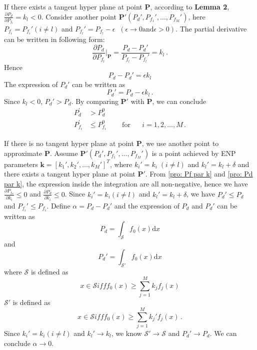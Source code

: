 \documentclass[12pt,journal,a4paper,twoside,onecolumn]{IEEEtran}
\begin{document}
\begin{spacing}{2.5}
 If there exists a tangent hyper plane at point $\mathbf{P}$, according to \textbf{Lemma 2}, $\frac{\partial P_d}{\partial P_{f_l}} = k_l < 0$. Consider another point $\mathbf{P}' (P_d', P_{f_1}', ..., P_{f_M}')$, here $P_{f_i} = P_{f_i}' (i \neq l)$ and $P_{f_l}' = P_{f_l} - \epsilon \;\;(\epsilon \rightarrow 0 \text{and} \epsilon >0)$. The partial derivative can be written in following form:
 \begin{equation}
   \frac{\partial P_d}{ \partial P_{f_l}} \bigg|_{\mathbf{P}} = \frac{P_d - P_d'}{P_{f_l} - P_{f_l}'} = k_l\,.
 \end{equation}
 Hence
 \begin{equation}
   P_d - P_d' = \epsilon k_l
 \end{equation}
 The expression of $P_d'$ can be written as
 \begin{equation}
   P_d'= P_d - \epsilon k_l\,.
 \end{equation}
Since $k_l < 0$, $P_d' > P_d$. By comparing $\mathbf{P}'$ with $\mathbf{P}$, we can conclude
\begin{equation}
\begin{split}
  P_{d}^\prime &> P_{d}^0\\
  P_{f_i}^\prime &\leq P_{f_i}^0 \;\;\;\;\;\;\;\;\text{for}\;\;\;\;\;\; i=1, 2, ..., M\,.
\end{split}
\end{equation}

If there is no tangent hyper plane at point $\mathbf{P}$, we use another point to approximate $\mathbf{P}$. 
Assume $\mathbf{P}' (P_d', P_{f_1}', ..., P_{f_M}')$ is a point achieved by ENP parameters $\mathbf{k}=[k_1', k_2', ..., k_M']^T$, where $k_i' = k_i \;(i \neq l)$ and $k_l' = k_l + \delta$ and there exists a tangent hyper plane at point $\mathbf{P}'$. From \eqref{pro: Pf par k} and \eqref{pro: Pd par k}, the expression inside the integration are all non-negative, hence we have $\frac{\partial P_{f_n}}{\partial k_i} \leq 0$ and $\frac{\partial P_d}{\partial k_i} \leq 0$. Since $k_i' = k_i (i \neq l)$ and $k_l' = k_l + \delta$, we have $P_d' \leq P_d$ and $P_{f_i}' \leq P_{f_i}$. Define $\alpha = P_d - P_d'$ and the expression of $P_d$ and $P_d'$ can be written as
\begin{equation}
  P_d = \int_{\mathcal{S}}f_0(x)\mathrm{d}x 
\end{equation}
and
\begin{equation}
  P_d' = \int_{\mathcal{S}'}f_0(x)\mathrm{d}x 
\end{equation}
where $\mathcal{S}$ is defined as 
\begin{equation}
x \in \mathcal{S} iff f_0(x) \geq \sum_{j=1}^M k_jf_j(x)
\end{equation}
$\mathcal{S}'$ is defined as
\begin{equation}
x \in \mathcal{S} iff f_0(x) \geq \sum_{j=1}^M k_j'f_j(x)\,.
\end{equation}
Since $k_i' = k_i (i \neq l)$ and $k_l' \rightarrow k_l$, we know $\mathcal{S}' \rightarrow \mathcal{S}$ and $P_d' \rightarrow P_d$. We can conclude $\alpha \rightarrow 0$.


\end{spacing}
\end{document}
